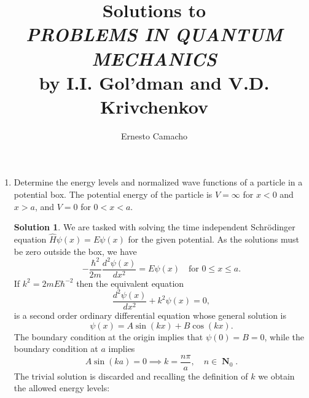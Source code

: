 \documentclass[a4paper]{article}
\title{Solutions to \protect\\\textit{PROBLEMS IN QUANTUM
    MECHANICS} \protect\\
by I.I. Gol'dman and V.D. Krivchenkov}
\author{Ernesto Camacho}
\DeclareMathOperator{\N}{\mathbf{N}}
\theoremstyle{definition}
\newtheorem*{sol}{Solution}
\begin{document}
    \maketitle

    \begin{enumerate}
        \item Determine the energy levels and normalized
            wave functions of a particle in a potential box.
            The potential energy of the particle is $V =
            \infty$ for $x < 0$ and $x > a$, and $V = 0$ for
            $0 < x < a$.

            \begin{sol}
                We are tasked with solving the time
                independent Schrödinger equation $\hat{H}
                \psi(x) = E \psi(x)$ for the given
                potential. As the solutions must be zero
                outside the box, we have
                \begin{equation}
                    -\frac{\hbar^2}{2m}
                    \frac{d^2\psi(x)}{dx^2}
                    = E \psi(x)
                    \quad
                    \text{for } 0 \leq x \leq a.
                \end{equation}
                If $k^2 = 2mE \hbar^{-2}$ then the
                equivalent equation
                \begin{equation}
                    \frac{d^2\psi(x)}{dx^2} + k^2 \psi(x)
                    = 0,
                \end{equation}
                is a second order ordinary differential
                equation whose general solution is
                \begin{equation}
                    \psi(x)
                    = A \sin(k x) + B \cos(k x).
                \end{equation}
                The boundary condition at the origin implies
                that $\psi(0) = B = 0$, while the boundary
                condition at $a$ implies
                \begin{equation}
                    A \sin(k a)
                    = 0
                    \implies
                    k
                    = \frac{n\pi}{a}, \quad n \in \N_{0}.
                \end{equation}
                The trivial solution is discarded and
                recalling the definition of $k$ we obtain
                the allowed energy levels:
                \begin{equation}

\end{equation}
\end{sol}
\end{enumerate}
\end{document}
